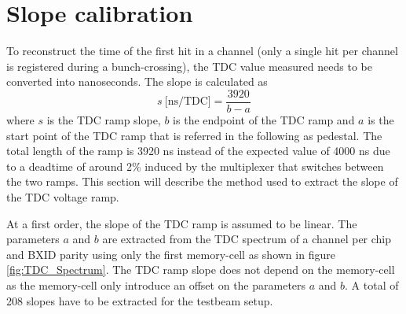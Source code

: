 \section{Slope calibration}
\label{subsec:slope_calib}

To reconstruct the time of the first hit in a channel (only a single hit per channel is registered during a bunch-crossing), the TDC value measured needs to be converted into nanoseconds. The slope is calculated as
\begin{equation} \label{eq:slope}
	s \: \text{[ns/TDC]} = \frac{3920}{b - a}
\end{equation}
where $s$ is the TDC ramp slope, $b$ is the endpoint of the TDC ramp and $a$ is the start point of the TDC ramp that is referred in the following as pedestal. The total length of the ramp is 3920 ns instead of the expected value of 4000 ns due to a deadtime of around 2\% \cite{Brianne2012} induced by the multiplexer that switches between the two ramps. This section will describe the method used to extract the slope of the TDC voltage ramp.

At a first order, the slope of the TDC ramp is assumed to be linear. The parameters $a$ and $b$ are extracted from the TDC spectrum of a channel per chip and BXID parity using only the first memory-cell as shown in figure \ref{fig:TDC_Spectrum}. The TDC ramp slope does not depend on the memory-cell as the memory-cell only introduce an offset on the parameters $a$ and $b$. A total of 208 slopes have to be extracted for the testbeam setup.


